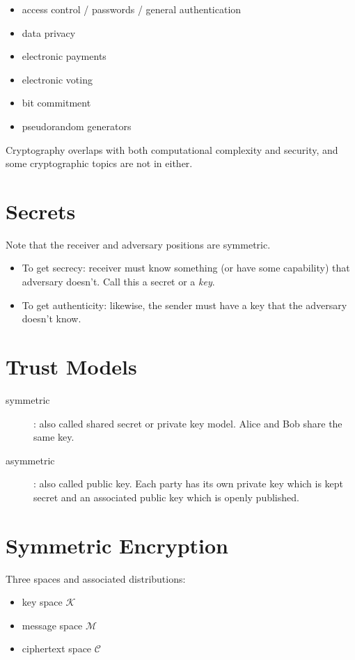 \documentclass[12pt]{article}
\begin{document}
\begin{itemize}
\item access control / passwords / general authentication
\item data privacy
\item electronic payments
\item electronic voting
\item bit commitment
\item pseudorandom generators
\end{itemize}

Cryptography overlaps with both computational complexity and security, and
some cryptographic topics are not in either.

\section{Secrets}

Note that the receiver and adversary positions are symmetric.

\begin{itemize}
\item
To get secrecy: receiver must know something (or have some capability)
that adversary doesn't. Call this a secret or a \textit{key}.
\item
To get authenticity: likewise, the sender must have a key that the
adversary doesn't know.
\end{itemize}

\section{Trust Models}

\begin{description}
\item[symmetric]: also called shared secret or private key model.
Alice and Bob share the same key.
\item[asymmetric]: also called public key.
Each party has its own private key which is kept secret and an
associated public key
which is openly published.
\end{description}

\section{Symmetric Encryption}

Three spaces and associated distributions:

\begin{itemize}
\item key space $\mathcal{K}$
\item message space $\mathcal{M}$
\item ciphertext space $\mathcal{C}$
\end{itemize}
\end{document}
